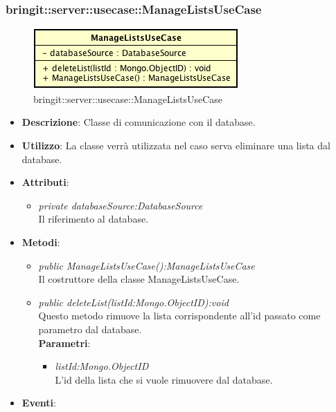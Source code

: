 \subsubsection{bringit::server::usecase::ManageListsUseCase}

\label{bringit::server::usecase::ManageListsUseCase}
\begin{figure}[H]
	\centering
	\includegraphics[scale=0.5]{Sezioni/SottosezioniST/img/app/ManageListsUseCase.png}
	\caption{bringit::server::usecase::ManageListsUseCase}
\end{figure}

\begin{itemize}
\item \textbf{Descrizione}: Classe di comunicazione con il database.
\item \textbf{Utilizzo}: La classe verrà utilizzata nel caso serva eliminare una lista dal database.
\item \textbf{Attributi}: 
	\begin{itemize}
	\item \textit{private databaseSource:DatabaseSource}\\
	Il riferimento al database.
	\end{itemize}
\item \textbf{Metodi}:
	\begin{itemize}
	\item \textit{public ManageListsUseCase():ManageListsUseCase}\\
	Il costruttore della classe ManageListsUseCase.
	\item \textit{public deleteList(listId:Mongo.ObjectID):void}\\
	Questo metodo rimuove la lista corrispondente all'id passato come parametro dal database.
				\\ \textbf{Parametri}: \begin{itemize}
			\item \textit{listId:Mongo.ObjectID}\\
			L'id della lista che si vuole rimuovere dal database.
					\end{itemize} 
	\end{itemize}
\item \textbf{Eventi}:
\end{itemize}
 
